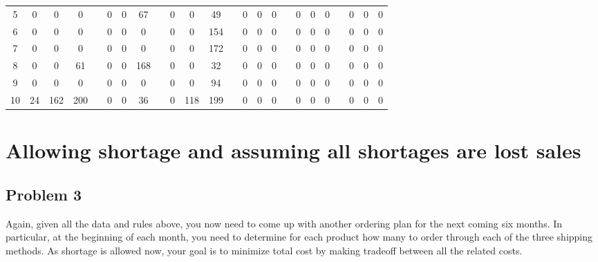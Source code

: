 \documentclass[12pt,a4paper]{article}
\begin{document}
\begin{table}[]
{\begin{tabular}{cccclllcccccllcccclccccl}
5       & 0      & 0       & 0      &  & 0                      & 0                      & 67  &                      & 0     & 0      & 49     &  & 0                      & 0  & 0  &                      & 0  & 0                      & 0  &                      & 0  & 0  & 0                      \\
6       & 0      & 0       & 0      &  & 0                      & 0                      & 0   &                      & 0     & 0      & 154    &  & 0                      & 0  & 0  &                      & 0  & 0                      & 0  &                      & 0  & 0  & 0                      \\
7       & 0      & 0       & 0      &  & 0                      & 0                      & 0   &                      & 0     & 0      & 172    &  & 0                      & 0  & 0  &                      & 0  & 0                      & 0  &                      & 0  & 0  & 0                      \\
8       & 0      & 0       & 61     &  & 0                      & 0                      & 168 &                      & 0     & 0      & 32     &  & 0                      & 0  & 0  &                      & 0  & 0                      & 0  &                      & 0  & 0  & 0                      \\
9       & 0      & 0       & 0      &  & 0                      & 0                      & 0   &                      & 0     & 0      & 94     &  & 0                      & 0  & 0  &                      & 0  & 0                      & 0  &                      & 0  & 0  & 0                      \\
10      & 24     & 162     & 200    &  & 0                      & 0                      & 36  &                      & 0     & 118    & 199    &  & 0                      & 0  & 0  &                      & 0  & 0                      & 0  &                      & 0  & 0  & 0                      \\ \hline
\end{tabular}}
\end{table}

\section{Allowing shortage and assuming all shortages are lost sales}
\subsection*{Problem 3}
Again, given all the data and rules above, you now need to come up with another ordering
plan for the next coming six months. In particular, at the beginning of each month, you
need to determine for each product how many to order through each of the three shipping
methods. As shortage is allowed now, your goal is to minimize total cost by making tradeoff between all the related costs.\\
\end{document}
